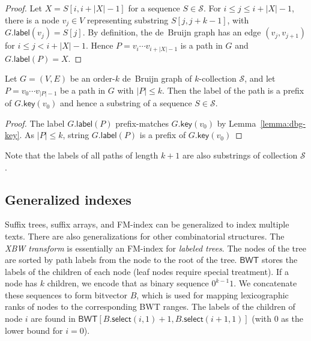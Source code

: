 \documentclass[a4paper,UKenglish]{lipics-v2016}
\newcommand{\abs}[1]{\ensuremath{\lvert #1 \rvert}}
\newcommand{\select}{\ensuremath{\mathsf{select}}}
\newcommand{\glabel}{\ensuremath{\mathsf{label}}}
\newcommand{\gkey}{\ensuremath{\mathsf{key}}}
\newcommand{\kcollection}[1]{$#1$\nobreakdash-collection}
\newcommand{\orderk}[1]{order\nobreakdash-$#1$}
\newcommand{\FMindex}{FM\nobreakdash-index}
\newcommand{\BWT}{\ensuremath{\mathsf{BWT}}}
\begin{document}
\begin{proof}
Let $X = S[i, i+\abs{X}-1]$ for a sequence $S \in \mathcal{S}$. For $i \le j \le i+\abs{X}-1$, there is a node $v_{j} \in V$ representing substring $S[j, j+k-1]$, with $G.\glabel(v_{j}) = S[j]$. By definition, the de~Bruijn graph has an edge $(v_{j}, v_{j+1})$ for $i \le j < i+\abs{X}-1$. Hence $P = v_{i} \dotsm v_{i+\abs{X}-1}$ is a path in $G$ and $G.\glabel(P) = X$.
\end{proof}

\begin{lemma}[No false positives with $\abs{P} \le k$]\label{lemma:dbg-fp}
Let $G = (V, E)$ be an \orderk{k} de~Bruijn graph of \kcollection{k} $\mathcal{S}$, and let $P = v_{0} \dotsm v_{\abs{P}-1}$ be a path in $G$ with $\abs{P} \le k$. Then the label of the path is a prefix of $G.\gkey(v_{0})$ and hence a substring of a sequence $S \in \mathcal{S}$.
\end{lemma}

\begin{proof}
The label $G.\glabel(P)$ prefix-matches $G.\gkey(v_{0})$ by Lemma~\ref{lemma:dbg-key}. As $\abs{P} \le k$, string $G.\glabel(P)$ is a prefix of $G.\gkey(v_{0})$
\end{proof}

Note that the labels of all paths of length $k+1$ are also substrings of collection $\mathcal{S}$.

\subsection{Generalized indexes}

Suffix trees, suffix arrays, and \FMindex{} can be generalized to index multiple texts. There are also generalizations for other combinatorial structures. The \emph{XBW transform} \cite{Ferragina2009b} is essentially an \FMindex{} for \emph{labeled trees}. The nodes of the tree are sorted by path labels from the node to the root of the tree. $\BWT$ stores the labels of the children of each node (leaf nodes require special treatment). If a node has $k$ children, we encode that as binary sequence $0^{k-1} 1$. We concatenate these sequences to form bitvector $B$, which is used for mapping lexicographic ranks of nodes to the corresponding BWT ranges. The labels of the children of node $i$ are found in $\BWT[B.\select(i, 1) + 1, B.\select(i + 1, 1)]$ (with $0$ as the lower bound for $i = 0$).
\end{document}
